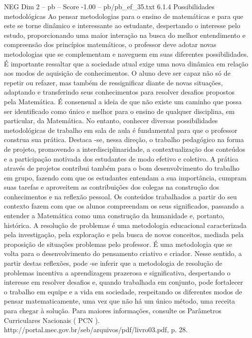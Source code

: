 \begin{textsample}{NEG Dim 2 – pb – Score -1.00 – pb/pb\_ef\_35.txt}  \label{ex:f2_neg_011}
6.1.4 Possibilidades metodológicas Ao pensar metodologias para o ensino de matemáticas e para que este se torne dinâmico e interessante ao estudante, despertando o interesse pelo estudo, proporcionando uma maior interação na busca do melhor entendimento e compreensão dos princípios matemáticos, o professor deve adotar novas metodologias que se complementam e naveguem em suas diferentes possibilidades.
É importante ressaltar que a sociedade atual exige uma nova dinâmica em relação aos modos de aquisição de conhecimentos.
O aluno deve ser capaz não só de repetir ou refazer, mas também de ressignificar diante de novas situações, adaptando e transferindo seus conhecimentos para resolver desafios propostos pela Matemática.
É consensual a ideia de que não existe um caminho que possa ser identificado como único e melhor para o ensino de qualquer disciplina, em particular, da Matemática.
No entanto, conhecer diversas possibilidades metodológicas de trabalho em sala de aula é fundamental para que o professor construa sua prática.
Destaca -se, nessa direção, o trabalho pedagógico na forma de projeto, promovendo a interdisciplinaridade, a contextualização dos conteúdos e a participação motivada dos estudantes de modo efetivo e coletivo.
A prática através de projetos contribui também para o bom desenvolvimento do trabalho em grupo, fazendo com que os estudantes entendam a sua importância, cumpram suas tarefas e aproveitem as contribuições dos colegas na construção dos conhecimentos e na reflexão pessoal.
Os conteúdos trabalhados a partir do seu contexto fazem com que os alunos compreendam os seus significados, passando a entender a Matemática como uma construção da humanidade e, portanto, histórica.
A resolução de problemas é uma metodologia educacional caracterizada pela investigação, pela exploração e pela busca de novos conceitos, mediada pela proposição de situações problemas pelo professor.
É uma metodologia que se volta para o desenvolvimento do pensamento criativo e criador.
Nesse sentido, a partir destas reflexões, pode -se inferir que a metodologia de resolução de problemas incentiva a aprendizagem prazerosa e significativa, despertando o interesse em resolver desafios e, quando trabalhada em conjunto, pode fortalecer o trabalho em equipe e a vida em sociedade, respeitando os diferentes modos de pensar matematicamente, uma vez que não há um único método, uma receita para chegar à solução.
Para maiores informações, consulte os Parâmetros Curriculares Nacionais ( PCN ). http://portal.mec.gov.br/seb/arquivos/pdf/livro03.pdf, p. 28.

\end{textsample}
